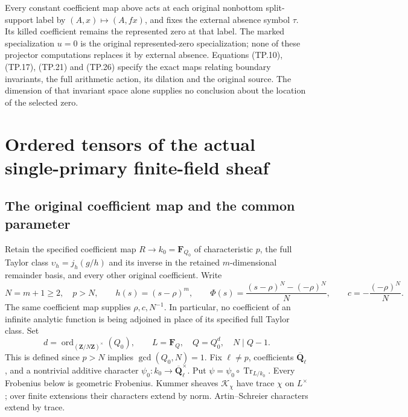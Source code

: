 Every constant coefficient map above acts at each original
nonbottom split-support label by \((A,x)\mapsto(A,fx)\),
and fixes the external absence symbol \(\tau\). Its killed
coefficient remains the represented zero at that label.
The marked specialization \(u=0\) is the original
represented-zero specialization; none of these projector
computations replaces it by external absence. Equations
(TP.10), (TP.17), (TP.21) and (TP.26) specify the exact maps
relating boundary invariants, the full arithmetic action,
its dilation and the original source. The dimension of
that invariant space alone supplies no conclusion about
the location of the selected zero.

\section{Ordered tensors of the actual single-primary finite-field sheaf}
\label{CFStage:sec:TPF}

\subsection{The original coefficient map and the common parameter}

Retain the specified coefficient map \(R\to k_0=\mathbf F_{Q_0}\)
of characteristic \(p\), the full Taylor class
\(\upsilon_h=j_h(g/h)\) and its inverse in the retained
\(m\)-dimensional remainder basis, and every other original
coefficient. Write
\[
 N=m+1\ge2,\quad p>N,\qquad
 h(s)=(s-\rho)^m,\qquad
 \Phi(s)=\frac{(s-\rho)^N-(-\rho)^N}{N},\qquad
 c=-\frac{(-\rho)^N}{N}.
 \tag{TPF.1}\label{CFStage:eq:TPF1}
\]
The same coefficient map supplies \(\rho,c,N^{-1}\). In
particular, no coefficient of an infinite analytic function
is being adjoined in place of its specified full Taylor class.
Set
\[
 d=\operatorname{ord}_{(\mathbf Z/N\mathbf Z)^\times}(Q_0),
 \qquad L=\mathbf F_Q,\quad Q=Q_0^d,\quad N\mid Q-1.
 \tag{TPF.2}\label{CFStage:eq:TPF2}
\]
This is defined since \(p>N\) implies \(\gcd(Q_0,N)=1\).
Fix \(\ell\ne p\), coefficients \(\overline{\mathbf Q}_\ell\),
and a nontrivial additive character \(\psi_0:k_0\to
\overline{\mathbf Q}_\ell^\times\). Put
\(\psi=\psi_0\circ\operatorname{Tr}_{L/k_0}\).
Every Frobenius below is geometric Frobenius. Kummer sheaves
\(\mathcal K_\chi\) have trace \(\chi\) on \(L^\times\);
over finite extensions their characters extend by norm.
Artin--Schreier characters extend by trace.

